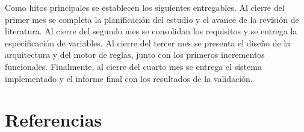 \documentclass[stu, spanish]{apa7}
\begin{document}
Como hitos principales se establecen los siguientes entregables. Al cierre del primer mes se completa la planificaci\'{o}n del estudio y el avance de la revisi\'{o}n de literatura. Al cierre del segundo mes se consolidan los requisitos y se entrega la especificaci\'{o}n de variables. Al cierre del tercer mes se presenta el dise\~{n}o de la arquitectura y del motor de reglas, junto con los primeros incrementos funcionales. Finalmente, al cierre del cuarto mes se entrega el sistema implementado y el informe final con los resultados de la validaci\'{o}n.

\newpage

\section*{Referencias}
\end{document}
